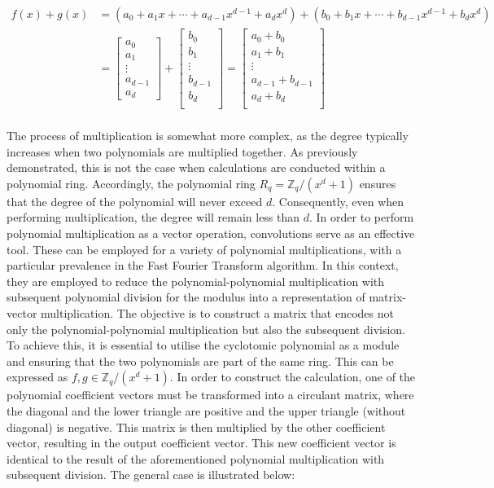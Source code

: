\begin{align*}
  f(x) + g(x) & = {
  (a_0+ a_1x+\cdots+ a_{d-1}x^{d-1}+a_dx^d)+
  (b_0+ b_1x+\cdots+ b_{d-1}x^{d-1}+b_dx^d)
  }                  \\
              & = {
  \begin{bmatrix}
    a_0     \\
    a_1     \\
    \vdots  \\
    a_{d-1} \\
    a_d
  \end{bmatrix} + 
  \begin{bmatrix}
    b_0     \\
    b_1     \\
    \vdots  \\
    b_{d-1} \\
    b_d     \\
  \end{bmatrix} }     = {
  \begin{bmatrix}
    a_0     +     b_0   \\
    a_1     +  b_1      \\
    \vdots              \\
    a_{d-1} +   b_{d-1} \\
    a_d +   b_d         \\
  \end{bmatrix}
  }                  \\
\end{align*}

The process of multiplication is somewhat more complex, as the degree typically increases when two polynomials are multiplied together. As previously demonstrated, this is not the case when calculations are conducted within a polynomial ring. Accordingly, the polynomial ring $R_q = \mathbb{Z}_q/(x^d+1)$ ensures that the degree of the polynomial will never exceed $d$. Consequently, even when performing multiplication, the degree will remain less than $d$. In order to perform polynomial multiplication as a vector operation, convolutions serve as an effective tool. These can be employed for a variety of polynomial multiplications, with a particular prevalence in the Fast Fourier Transform algorithm. In this context, they are employed to reduce the polynomial-polynomial multiplication with subsequent polynomial division for the modulus into a representation of matrix-vector multiplication. The objective is to construct a matrix that encodes not only the polynomial-polynomial multiplication but also the subsequent division. To achieve this, it is essential to utilise the cyclotomic polynomial as a module and ensuring that the two polynomials are part of the same ring. This can be expressed as $f, g \in \mathbb{Z}_q/(x^d+1)$. In order to construct the calculation, one of the polynomial coefficient vectors must be transformed into a circulant matrix, where the diagonal and the lower triangle are positive and the upper triangle (without diagonal) is negative. This matrix is then multiplied by the other coefficient vector, resulting in the output coefficient vector. This new coefficient vector is identical to the result of the aforementioned polynomial multiplication with subsequent division. The general case is illustrated below:

